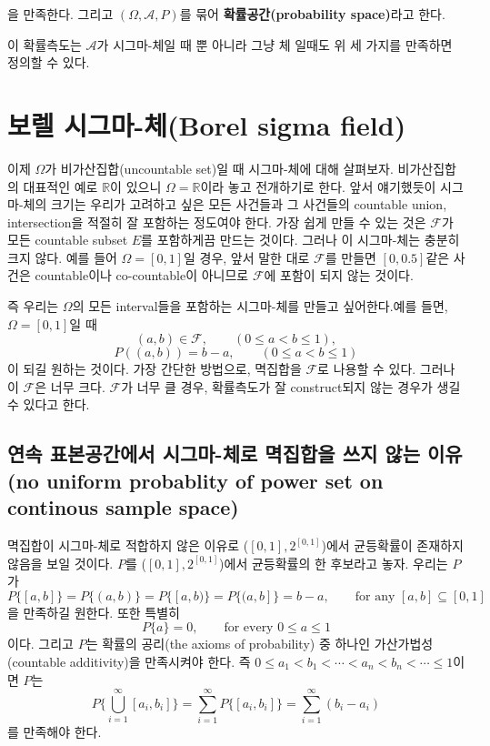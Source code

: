 \documentclass[b5paper,]{scrbook}
\theoremstyle{plain}
\theoremstyle{definition}
\numberwithin{equation}{section}
\begin{document}
을 만족한다. 그리고 \((\Omega, \mathcal{A}, P)\)를 묶어
\textbf{확률공간(probability space)}라고 한다.

이 확률측도는 \(\mathcal{A}\)가 시그마-체일 때 뿐 아니라 그냥 체 일때도
위 세 가지를 만족하면 정의할 수 있다.

\section{보렐 시그마-체(Borel sigma field)}\label{--borel-sigma-field}

이제 \(\Omega\)가 비가산집합(uncountable set)일 때 시그마-체에 대해
살펴보자. 비가산집합의 대표적인 예로 \(\mathbb{R}\)이 있으니
\(\Omega=\mathbb{R}\)이라 놓고 전개하기로 한다. 앞서 얘기했듯이
시그마-체의 크기는 우리가 고려하고 싶은 모든 사건들과 그 사건들의
countable union, intersection을 적절히 잘 포함하는 정도여야 한다. 가장
쉽게 만들 수 있는 것은 \(\mathcal{F}\)가 모든 countable subset \(E\)를
포함하게끔 만드는 것이다. 그러나 이 시그마-체는 충분히 크지 않다. 예를
들어 \(\Omega=[0,1]\)일 경우, 앞서 말한 대로 \(\mathcal{F}\)를 만들면
\([0,0.5]\)같은 사건은 countable이나 co-countable이 아니므로
\(\mathcal{F}\)에 포함이 되지 않는 것이다.

즉 우리는 \(\Omega\)의 모든 interval들을 포함하는 시그마-체를 만들고
싶어한다.예를 들면, \(\Omega=[0,1]\)일 때
\[(a,b)\in\mathcal{F}, \qquad{(0\leq a < b \leq 1),}\]
\[P((a,b))=b-a, \qquad{(0\leq a < b \leq 1)}\] 이 되길 원하는 것이다.
가장 간단한 방법으로, 멱집합을 \(\mathcal{F}\)로 나용할 수 있다. 그러나
이 \(\mathcal{F}\)은 너무 크다. \(\mathcal{F}\)가 너무 클 경우,
확률측도가 잘 construct되지 않는 경우가 생길 수 있다고 한다.

\subsection{연속 표본공간에서 시그마-체로 멱집합을 쓰지 않는 이유(no
uniform probablity of power set on continous sample
space)}\label{-------no-uniform-probablity-of-power-set-on-continous-sample-space}

멱집합이 시그마-체로 적합하지 않은 이유로 (\([0,1], 2^{[0,1]}\))에서
균등확률이 존재하지 않음을 보일 것이다. \(P\)를
(\([0,1], 2^{[0,1]}\))에서 균등확률의 한 후보라고 놓자. 우리는 \(P\)가
\[P\{[a,b]\}=P\{(a,b)\}=P\{[a,b)\}=P\{(a,b]\}=b-a, \qquad{\text{for any }[a,b]\subseteq [0,1]}\]
을 만족하길 원한다. 또한 특별히
\[P\{a\}=0, \qquad{\text{for every }0\leq a \leq 1}\] 이다. 그리고
\(P\)는 확률의 공리(the axioms of probability) 중 하나인
가산가법성(countable additivity)을 만족시켜야 한다. 즉
\(0\leq a_{1}<b_{1}<\cdots <a_{n}<b_{n}<\cdots \leq 1\)이면 \(P\)는
\[P\{\bigcup_{i=1}^{\infty}[a_{i},b_{i}]\}=\sum_{i=1}^{\infty}P\{[a_{i},b_{i}]\}=\sum_{i=1}^{\infty}(b_{i}-a_{i})\]
를 만족해야 한다.
\end{document}

